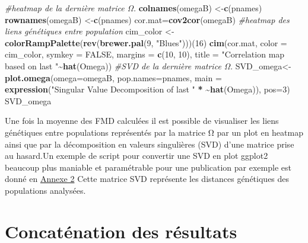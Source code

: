 \documentclass[
  openany]{book}
\newenvironment{Shaded}{\begin{snugshade}}{\end{snugshade}}
\newcommand{\AttributeTok}[1]{\textcolor[rgb]{0.13,0.29,0.53}{#1}}
\newcommand{\CommentTok}[1]{\textcolor[rgb]{0.56,0.35,0.01}{\textit{#1}}}
\newcommand{\ConstantTok}[1]{\textcolor[rgb]{0.56,0.35,0.01}{#1}}
\newcommand{\DecValTok}[1]{\textcolor[rgb]{0.00,0.00,0.81}{#1}}
\newcommand{\ErrorTok}[1]{\textcolor[rgb]{0.64,0.00,0.00}{\textbf{#1}}}
\newcommand{\FunctionTok}[1]{\textcolor[rgb]{0.13,0.29,0.53}{\textbf{#1}}}
\newcommand{\NormalTok}[1]{#1}
\newcommand{\OtherTok}[1]{\textcolor[rgb]{0.56,0.35,0.01}{#1}}
\newcommand{\SpecialCharTok}[1]{\textcolor[rgb]{0.81,0.36,0.00}{\textbf{#1}}}
\newcommand{\StringTok}[1]{\textcolor[rgb]{0.31,0.60,0.02}{#1}}
\theoremstyle{definition}
\theoremstyle{definition}
\theoremstyle{definition}
\theoremstyle{definition}
\theoremstyle{remark}
\begin{document}
\begin{Shaded}
\begin{Highlighting}[]
\CommentTok{\#heatmap de la dernière matrice Ω.}
\FunctionTok{colnames}\NormalTok{(omegaB) }\OtherTok{\textless{}{-}}\FunctionTok{c}\NormalTok{(pnames)}
\FunctionTok{rownames}\NormalTok{(omegaB) }\OtherTok{\textless{}{-}}\FunctionTok{c}\NormalTok{(pnames)}
\NormalTok{cor.mat}\OtherTok{=}\FunctionTok{cov2cor}\NormalTok{(omegaB)}
\CommentTok{\#heatmap des liens génétiques entre population}
\NormalTok{cim\_color }\OtherTok{\textless{}{-}} \FunctionTok{colorRampPalette}\NormalTok{(}\FunctionTok{rev}\NormalTok{(}\FunctionTok{brewer.pal}\NormalTok{(}\DecValTok{9}\NormalTok{, }\StringTok{"Blues"}\NormalTok{)))(}\DecValTok{16}\NormalTok{)}
\FunctionTok{cim}\NormalTok{(cor.mat, }\AttributeTok{color =}\NormalTok{ cim\_color, }\AttributeTok{symkey =} \ConstantTok{FALSE}\NormalTok{, }\AttributeTok{margins =} \FunctionTok{c}\NormalTok{(}\DecValTok{10}\NormalTok{, }\DecValTok{10}\NormalTok{), }\AttributeTok{title =} \StringTok{"Correlation map based on last "}\SpecialCharTok{\textasciitilde{}}\FunctionTok{hat}\NormalTok{(Omega))}
\CommentTok{\#SVD de la dernière matrice Ω.}
\NormalTok{SVD\_omega}\OtherTok{\textless{}{-}}\FunctionTok{plot.omega}\NormalTok{(}\AttributeTok{omega=}\NormalTok{omegaB, }\AttributeTok{pop.names=}\NormalTok{pnames, }\AttributeTok{main =} \FunctionTok{expression}\NormalTok{(}\StringTok{"Singular Value Decomposition of last "} \SpecialCharTok{*} \ErrorTok{\textasciitilde{}}\FunctionTok{hat}\NormalTok{(Omega)), }\AttributeTok{pos=}\DecValTok{3}\NormalTok{)}
\NormalTok{SVD\_omega}
\end{Highlighting}
\end{Shaded}

Une fois la moyenne des FMD calculées il est possible de visualiser les liens génétiques entre populations représentés par la matrice Ω par un plot en heatmap ainsi que par la décomposition en valeurs singulières (SVD) d'une matrice prise au hasard.Un exemple de script pour convertir une SVD en plot ggplot2 beaucoup plus maniable et paramétrable pour une publication par exemple est donné en \protect\hyperlink{An2}{Annexe 2}
Cette matrice SVD représente les distances génétiques des populations analysées.

\hypertarget{concatuxe9nation-des-ruxe9sultats}{%
\section*{Concaténation des résultats}\label{concatuxe9nation-des-ruxe9sultats}}
\end{document}
